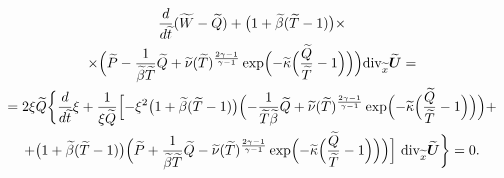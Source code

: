 \begin{multline}

\label{lukashev:WQ}

\frac{d}{d\widetilde{t}} (\widetilde{W}-\widetilde{Q})+

\bigl(1+\widetilde{\beta}(\widetilde{T}-1)\bigr) \times 

\\

\times

\Bigl(\widetilde{P}-\frac{1}{\widetilde{\beta}\widetilde{T}} \widetilde{Q}+\widetilde{\nu} (\widetilde{T})^{\frac{2\gamma-1}{\gamma-1}} 

\exp\Bigl(-\widetilde{\kappa}\Bigl(\frac{\widetilde{Q}}{\widetilde{T}}-1\Bigr) \Bigr)\Bigr) {\mathop{\rm div}\nolimits}_{\widetilde{x}} \widetilde{\boldsymbol U}=

\\

= 2\xi \widetilde{Q}

\biggl\{

\frac{d}{d\widetilde{t}} \xi+\frac1{\xi \widetilde{Q}} 

\Bigl[-\xi^2 \bigl(1+\widetilde{\beta}(\widetilde{T}-1)\bigr)

\Bigl(-\frac{1}{\widetilde{T} \widetilde{\beta}} \widetilde{Q}+\widetilde{\nu}

(\widetilde{T})^{\frac{2\gamma-1}{\gamma-1}}

 \exp\Bigl(-\widetilde{\kappa}\Bigl(\frac{\widetilde{Q}}{\widetilde{T}}-1\Bigr) \Bigr)

 \Bigr)+

\\

+\bigl(1+\widetilde{\beta}(\widetilde{T}-1)\bigr)

\Bigl(\widetilde{P}+\frac{1}{\widetilde{\beta}\widetilde{T}} \widetilde{Q}-\widetilde{\nu} (\widetilde{T})^{\frac{2\gamma-1}{\gamma-1}} 

\exp\Bigl(-\widetilde{\kappa}\Bigl(\frac{\widetilde{Q}}{\widetilde{T}}-1\Bigr) \Bigr)\Bigr) \Bigr]~{\mathop{\rm div}\nolimits}_{\widetilde{x}} \widetilde{\boldsymbol U}\biggr\}=0.

\end{multline}




